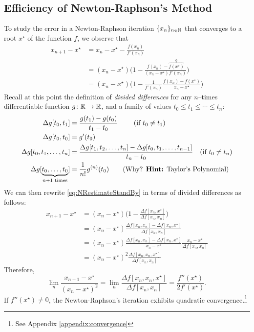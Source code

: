 \subsection{Efficiency of Newton-Raphson's Method}
To study the error in a Newton-Raphson iteration $\{ x_n \}_{n \in \mathbb{N}}$ that converges to a root $x^\star$ of the function $f$, we observe that
\begin{align}
x_{n+1} - x^\star &= x_n - x^\star - \frac{f(x_n)}{f'(x_n)} \nonumber \\
&= (x_n - x^\star) \bigg( 1 - \frac{f(x_n)-\overbrace{f(x^\star)}^0}{(x_n-x^\star)f'(x_n)} \bigg) \nonumber \\
&= (x_n - x^\star) \bigg( 1 - \frac{1}{f'(x_n)} \frac{f(x_n) - f(x^\star)}{x_n - x^\star} \bigg) \label{eq:NRestimateStandBy}
\end{align}
Recall at this point the definition of \emph{divided differences} for any $n$--times differentiable function $g\colon \mathbb{R} \to \mathbb{R}$, and a family of values $t_0 \leq t_1 \leq \dotsb \leq t_n$:
\begin{align*}
\Delta g[t_0,t_1] &= \frac{g(t_1)-g(t_0)}{t_1-t_0} \qquad\text{ (if }t_0 \neq t_1)\\
\Delta g[t_0,t_0] &= g'(t_0) \\
\Delta g[t_0,t_1,\dotsc,t_n] &= \frac{\Delta g[t_1, t_2, \dotsc, t_n] - \Delta g[t_0, t_1, \dotsc, t_{n-1}]}{t_n-t_0} \quad\text{(if }t_0 \neq t_n)\\
\Delta g[\underbrace{t_0, \dotsc, t_0}_{n+1 \text{ times}}] &= \frac{1}{n!} g^{(n)}(t_0) \qquad \text{(Why? \textbf{Hint:} Taylor's Polynomial)}
\end{align*}
We can then rewrite \eqref{eq:NRestimateStandBy} in terms of divided differences as follows:
\begin{align*}
x_{n+1} - x^\star &= (x_n - x^\star) \bigg( 1 - \frac{\Delta f[x_n, x^\star]}{\Delta f[x_n, x_n]}  \bigg) \\
&= (x_n - x^\star) \frac{ \Delta f[x_n, x_n] - \Delta f[x_n, x^\star] }{\Delta f [x_n,x_n]} \\
&= (x_n - x^\star) \frac{ \Delta f[x_n, x_n] - \Delta f[x_n, x^\star] }{x_n - x^\star} \frac{ x_n - x^\star }{\Delta f [x_n,x_n]} \\
& =(x_n - x^\star)^2 \frac{\Delta f[x_n, x_n, x^\star]}{\Delta f[x_n, x_n]}
\end{align*}
Therefore, 
\begin{equation*}
\lim_n \frac{x_{n+1}-x^\star}{(x_n - x^\star)^2} = \lim_n \frac{\Delta f[x_n, x_n, x^\star]}{\Delta f[x_n, x_n]} 
= \frac{f''(x^\star)}{2f'(x^\star)}.
\end{equation*}
If $f''(x^\star) \neq 0$, the Newton-Raphson's iteration exhibits quadratic convergence.\footnote{See Appendix \ref{appendix:convergence}}

